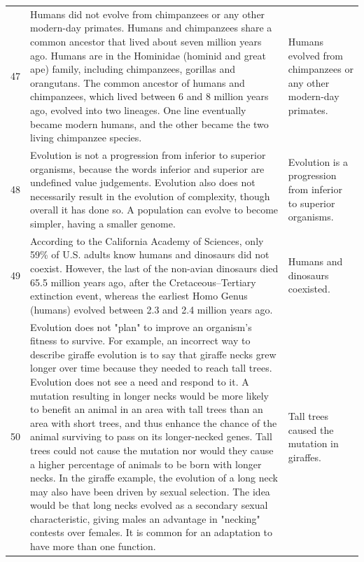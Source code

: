 \begin{tabular}{c|p{}|p{}}
47 & Humans did not evolve from chimpanzees or any other modern-day primates. Humans and chimpanzees share a common ancestor that lived about seven million years ago. Humans are in the Hominidae (hominid and great ape) family, including chimpanzees, gorillas and orangutans. The common ancestor of humans and chimpanzees, which lived between 6 and 8 million years ago, evolved into two lineages. One line eventually became modern humans, and the other became the two living chimpanzee species. & Humans evolved from chimpanzees or any other modern-day primates. \\
48 & Evolution is not a progression from inferior to superior organisms, because the words inferior and superior are undefined value judgements. Evolution also does not necessarily result in the evolution of complexity, though overall it has done so. A population can evolve to become simpler, having a smaller genome. & Evolution is a progression from inferior to superior organisms. \\
49 & According to the California Academy of Sciences, only 59\% of U.S. adults know humans and dinosaurs did not coexist. However, the last of the non-avian dinosaurs died 65.5 million years ago, after the Cretaceous–Tertiary extinction event, whereas the earliest Homo Genus (humans) evolved between 2.3 and 2.4 million years ago. & Humans and dinosaurs coexisted. \\
50 & Evolution does not "plan" to improve an organism's fitness to survive. For example, an incorrect way to describe giraffe evolution is to say that giraffe necks grew longer over time because they needed to reach tall trees. Evolution does not see a need and respond to it. A mutation resulting in longer necks would be more likely to benefit an animal in an area with tall trees than an area with short trees, and thus enhance the chance of the animal surviving to pass on its longer-necked genes. Tall trees could not cause the mutation nor would they cause a higher percentage of animals to be born with longer necks. In the giraffe example, the evolution of a long neck may also have been driven by sexual selection. The idea would be that long necks evolved as a secondary sexual characteristic, giving males an advantage in "necking" contests over females. It is common for an adaptation to have more than one function. & Tall trees caused the mutation in giraffes. \\

\end{tabular}
